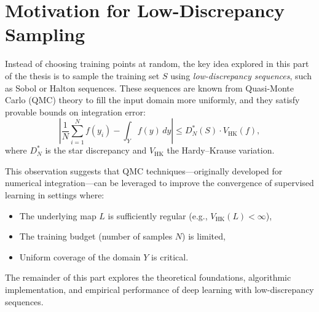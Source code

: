 \section{Motivation for Low-Discrepancy Sampling}

Instead of choosing training points at random, the key idea explored in this part of the thesis is to sample the training set $S$ using \emph{low-discrepancy sequences}, such as Sobol or Halton sequences. These sequences are known from Quasi-Monte Carlo (QMC) theory to fill the input domain more uniformly, and they satisfy provable bounds on integration error:
\[
\left| \frac{1}{N} \sum_{i=1}^N f(y_i) - \int_Y f(y) \, dy \right| \leq D^*_N(S) \cdot V_{\mathrm{HK}}(f),
\]
where $D^*_N$ is the star discrepancy and $V_{\mathrm{HK}}$ the Hardy–Krause variation.

This observation suggests that QMC techniques—originally developed for numerical integration—can be leveraged to improve the convergence of supervised learning in settings where:

\begin{itemize}
    \item The underlying map $L$ is sufficiently regular (e.g., $V_{\mathrm{HK}}(L) < \infty$),
    \item The training budget (number of samples $N$) is limited,
    \item Uniform coverage of the domain $Y$ is critical.
\end{itemize}

The remainder of this part explores the theoretical foundations, algorithmic implementation, and empirical performance of deep learning with low-discrepancy sequences.








